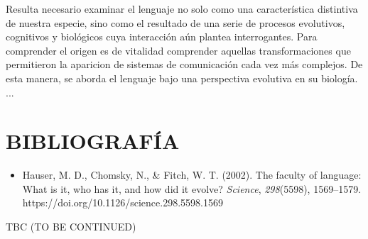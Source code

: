 \documentclass[12pt]{article}
\begin{document}
Resulta necesario examinar el lenguaje no solo como una característica distintiva de nuestra especie, sino como el resultado de una serie de procesos evolutivos, cognitivos y biológicos cuya interacción aún plantea interrogantes. Para comprender el origen es de vitalidad comprender aquellas transformaciones que permitieron la aparicion de sistemas de comunicación cada vez más complejos. De esta manera, se aborda el lenguaje bajo una perspectiva evolutiva en su biología.
... 


\section{BIBLIOGRAFÍA}
\begin{itemize}
  \item Hauser, M. D., Chomsky, N., \& Fitch, W. T. (2002). The faculty of language: What is it, who has it, and how did it evolve? \textit{Science}, \textit{298}(5598), 1569--1579. https://doi.org/10.1126/science.298.5598.1569
\end{itemize}

TBC (TO BE CONTINUED) 
\end{document}
